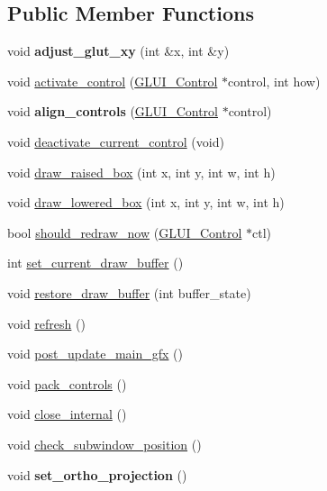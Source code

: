 \subsection*{Public Member Functions}
\begin{DoxyCompactItemize}
\item 
\hypertarget{classGLUI__Main_a8489a73dc673357da03075fb1decfc21}{void {\bfseries adjust\-\_\-glut\-\_\-xy} (int \&x, int \&y)}\label{classGLUI__Main_a8489a73dc673357da03075fb1decfc21}

\item 
void \hyperlink{classGLUI__Main_aafe506d2f17957f0ff81b7168d12428a}{activate\-\_\-control} (\hyperlink{classGLUI__Control}{G\-L\-U\-I\-\_\-\-Control} $\ast$control, int how)
\item 
\hypertarget{classGLUI__Main_a9a01bc045bb6689df3778a199fc68d51}{void {\bfseries align\-\_\-controls} (\hyperlink{classGLUI__Control}{G\-L\-U\-I\-\_\-\-Control} $\ast$control)}\label{classGLUI__Main_a9a01bc045bb6689df3778a199fc68d51}

\item 
void \hyperlink{classGLUI__Main_a819a4700253582ef4a49101c25b3a5a3}{deactivate\-\_\-current\-\_\-control} (void)
\item 
void \hyperlink{classGLUI__Main_a45cae7de3682226f44ab74d7afd44063}{draw\-\_\-raised\-\_\-box} (int x, int y, int w, int h)
\item 
void \hyperlink{classGLUI__Main_acbd304f272403767b0bcf610bd14cc05}{draw\-\_\-lowered\-\_\-box} (int x, int y, int w, int h)
\item 
bool \hyperlink{classGLUI__Main_a838a093d3748a6a6434f5e3a62d29c79}{should\-\_\-redraw\-\_\-now} (\hyperlink{classGLUI__Control}{G\-L\-U\-I\-\_\-\-Control} $\ast$ctl)
\item 
int \hyperlink{classGLUI__Main_a022e4708ab5f105fb49202b7dd28e7b4}{set\-\_\-current\-\_\-draw\-\_\-buffer} ()
\item 
void \hyperlink{classGLUI__Main_a56523ef45aea9c350009c6d91a67a028}{restore\-\_\-draw\-\_\-buffer} (int buffer\-\_\-state)
\item 
void \hyperlink{classGLUI__Main_acd1e25e989f0f1820c496d4b8b9ee422}{refresh} ()
\item 
void \hyperlink{classGLUI__Main_a64302740a0fb9ca34de276d001fbd8bd}{post\-\_\-update\-\_\-main\-\_\-gfx} ()
\item 
void \hyperlink{classGLUI__Main_aa3c49dcfbc912870344e9265354ad53a}{pack\-\_\-controls} ()
\item 
void \hyperlink{classGLUI__Main_a3a6613342a97448cad9677d291165889}{close\-\_\-internal} ()
\item 
void \hyperlink{classGLUI__Main_a8ca1f714c14dade8e6274112c69e5863}{check\-\_\-subwindow\-\_\-position} ()
\item 
\hypertarget{classGLUI__Main_a3216ab4a380f2a904e152524f4687e29}{void {\bfseries set\-\_\-ortho\-\_\-projection} ()}\label{classGLUI__Main_a3216ab4a380f2a904e152524f4687e29}


\end{DoxyCompactItemize}

